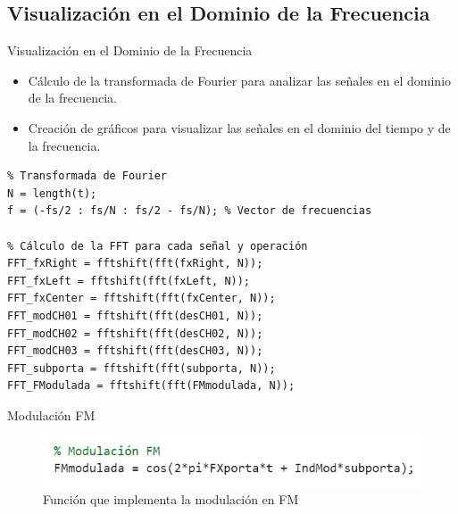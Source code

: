 \documentclass[mathserif,spanish]{beamer}
\begin{document}
\subsection{Visualización en el Dominio de la Frecuencia}
\begin{frame}{Visualización en el Dominio de la Frecuencia}
    \begin{itemize}
        \item Cálculo de la transformada de Fourier para analizar las señales en el dominio de la frecuencia.
        \item Creación de gráficos para visualizar las señales en el dominio del tiempo y de la frecuencia.
    \end{itemize}
    \begin{tcolorbox}[colback=yellow!5!white, colframe=yellow!75!black, title=Visualización en el Dominio del Tiempo y Frecuencia, fonttitle=\normalsize, fontupper=\normalsize]
\begin{lstlisting}
% Transformada de Fourier
N = length(t);
f = (-fs/2 : fs/N : fs/2 - fs/N); % Vector de frecuencias

% Cálculo de la FFT para cada señal y operación
FFT_fxRight = fftshift(fft(fxRight, N));
FFT_fxLeft = fftshift(fft(fxLeft, N));
FFT_fxCenter = fftshift(fft(fxCenter, N));
FFT_modCH01 = fftshift(fft(desCH01, N));
FFT_modCH02 = fftshift(fft(desCH02, N));
FFT_modCH03 = fftshift(fft(desCH03, N));
FFT_subporta = fftshift(fft(subporta, N));
FFT_FModulada = fftshift(fft(FMmodulada, N));
\end{lstlisting}
    \end{tcolorbox}
\end{frame}






\begin{frame}{Modulación FM}
    \begin{figure}[h]
        \centering
        \includegraphics[scale=0.5]{FMmodulada.png}
        \caption{Función que implementa la modulación en FM}
    \end{figure}

\end{frame}
\end{document}
